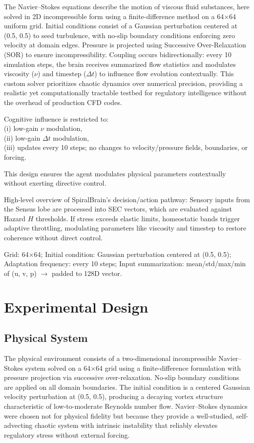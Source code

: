 \documentclass[12pt,a4paper]{article}
\begin{document}
The Navier--Stokes equations describe the motion of viscous fluid substances, here solved in 2D incompressible form using a finite-difference method on a 64×64 uniform grid. Initial conditions consist of a Gaussian perturbation centered at (0.5, 0.5) to seed turbulence, with no-slip boundary conditions enforcing zero velocity at domain edges. Pressure is projected using Successive Over-Relaxation (SOR) to ensure incompressibility. Coupling occurs bidirectionally: every 10 simulation steps, the brain receives summarized flow statistics and modulates viscosity ($\nu$) and timestep ($\Delta t$) to influence flow evolution contextually. This custom solver prioritizes chaotic dynamics over numerical precision, providing a realistic yet computationally tractable testbed for regulatory intelligence without the overhead of production CFD codes.

Cognitive influence is restricted to: \\ 
(i) low-gain $\nu$ modulation, \\ 
(ii) low-gain $\Delta t$ modulation, \\ 
(iii) updates every 10 steps; no changes to velocity/pressure fields, boundaries, or forcing.

This design ensures the agent modulates physical parameters contextually without exerting directive control.

High-level overview of SpiralBrain's decision/action pathway: Sensory inputs from the Sensus lobe are processed into SEC vectors, which are evaluated against Hazard $H$ thresholds. If stress exceeds elastic limits, homeostatic bands trigger adaptive throttling, modulating parameters like viscosity and timestep to restore coherence without direct control.

Grid: 64×64; Initial condition: Gaussian perturbation centered at (0.5, 0.5); Adaptation frequency: every 10 steps; Input summarization: mean/std/max/min of (u, v, p) $\rightarrow$ padded to 128D vector.

\section{Experimental Design}

\subsection{Physical System}

The physical environment consists of a two-dimensional incompressible Navier--Stokes system solved on a 64×64 grid using a finite-difference formulation with pressure projection via successive over-relaxation. No-slip boundary conditions are applied on all domain boundaries. The initial condition is a centered Gaussian velocity perturbation at (0.5, 0.5), producing a decaying vortex structure characteristic of low-to-moderate Reynolds number flow. Navier--Stokes dynamics were chosen not for physical fidelity but because they provide a well-studied, self-advecting chaotic system with intrinsic instability that reliably elevates regulatory stress without external forcing.
\end{document}
